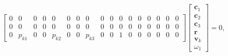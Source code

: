 \documentclass{article}
\begin{document}
\begin{align}
\begin{bmatrix}
        0 & 0 & 0 & 0 & 0 & 0 & 0 & 0 & 0 & 0 & 0 & 0 & 0 & 0 & 0 & 0 & 0 \\
        0 & 0 & 0 & 0 & 0 & 0 & 0 & 0 & 0 & 0 & 0 & 0 & 0 & 0 & 0 & 0 & 0 \\
        0 & p_{k1} & 0 & 0 & p_{k2} & 0 & 0 & p_{k3} & 0 & 0 & 1 & 0 & 0 & 0 & 0 & 0 & 0
    \end{bmatrix}
    \begin{bmatrix}
        \mathbf{c}_1 \\
        \mathbf{c}_2 \\
        \mathbf{c}_3 \\
        \mathbf{r} \\
        \mathbf{v}_k \\
        \omega_1
    \end{bmatrix} = 0,
\end{align}
\end{document}
